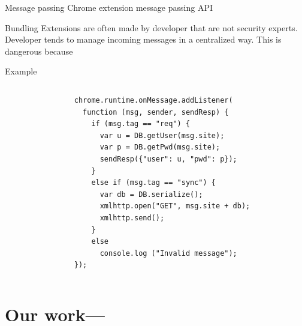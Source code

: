 \documentclass[11pt]{beamer}
\begin{document}
\begin{frame}{Message passing}
Chrome extension message passing API
\end{frame}

\begin{frame}{Bundling}
Extensions are often made by developer that are not security experts.
Developer tends to manage incoming messages in a centralized way. This is dangerous because 

\end{frame}

\begin{frame}[fragile]{Example}
\begin{columns}[T]
\begin{column}{.48\textwidth}

\end{column}
\begin{column}{.48\textwidth}
\begin{tiny}
\begin{lstlisting}
chrome.runtime.onMessage.addListener(
  function (msg, sender, sendResp) {
    if (msg.tag == "req") {
      var u = DB.getUser(msg.site);
      var p = DB.getPwd(msg.site);
      sendResp({"user": u, "pwd": p});
    }
    else if (msg.tag == "sync") {
      var db = DB.serialize();
      xmlhttp.open("GET", msg.site + db);
      xmlhttp.send();
    }
    else
      console.log ("Invalid message");
});
\end{lstlisting}
\end{tiny}
\end{column}
\end{columns}
\end{frame}

\section{Our work---}
\end{document}
